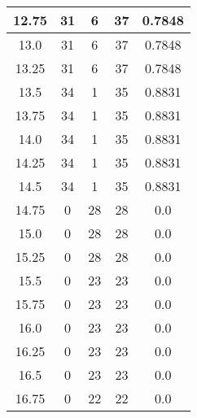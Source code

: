 \documentclass[letterpaper, 12pt]{article}
\begin{document}
\begin{longtable}{|c|c|c|c|c|}
\hline
12.75 & 31 & 6 & 37 & 0.7848 \\
\hline
13.0 & 31 & 6 & 37 & 0.7848 \\
\hline
13.25 & 31 & 6 & 37 & 0.7848 \\
\hline
13.5 & 34 & 1 & 35 & 0.8831 \\
\hline
13.75 & 34 & 1 & 35 & 0.8831 \\
\hline
14.0 & 34 & 1 & 35 & 0.8831 \\
\hline
14.25 & 34 & 1 & 35 & 0.8831 \\
\hline
14.5 & 34 & 1 & 35 & 0.8831 \\
\hline
14.75 & 0 & 28 & 28 & 0.0 \\
\hline
15.0 & 0 & 28 & 28 & 0.0 \\
\hline
15.25 & 0 & 28 & 28 & 0.0 \\
\hline
15.5 & 0 & 23 & 23 & 0.0 \\
\hline
15.75 & 0 & 23 & 23 & 0.0 \\
\hline
16.0 & 0 & 23 & 23 & 0.0 \\
\hline
16.25 & 0 & 23 & 23 & 0.0 \\
\hline
16.5 & 0 & 23 & 23 & 0.0 \\
\hline
16.75 & 0 & 22 & 22 & 0.0 \\
\hline
\end{longtable}
\end{document}
